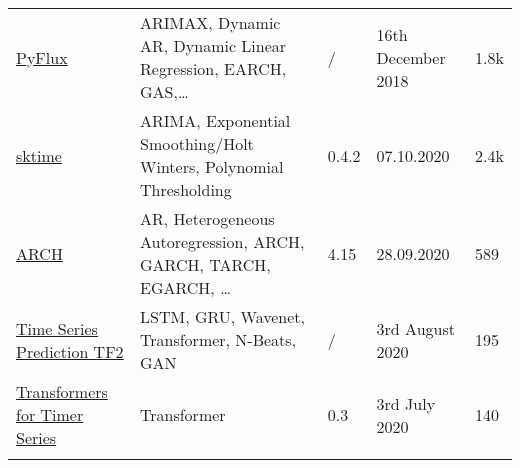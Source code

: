 \begin{table}[h]
{\begin{tabular}{lllll}
            \href{https://github.com/RJT1990/pyflux}{PyFlux}                                            & ARIMAX, Dynamic AR, Dynamic Linear Regression, EARCH, GAS,\ldots                                                                                                                                                                                                                                                                  & /         & 16th December 2018    & 1.8k  \\\addlinespace
            \href{https://github.com/alan-turing-institute/sktime}{sktime}                              & ARIMA, Exponential Smoothing/Holt Winters, Polynomial Thresholding                                                                                                                                                                                                                                                                & 0.4.2     & 07.10.2020            & 2.4k  \\\addlinespace
            \href{https://github.com/bashtage/arch}{ARCH}                                               & AR, Heterogeneous Autoregression, ARCH, GARCH, TARCH, EGARCH, \ldots                                                                                                                                                                                                                                                              & 4.15      & 28.09.2020            & 589   \\\addlinespace
            \href{https://github.com/LongxingTan/Time-series-prediction}{Time Series Prediction TF2}    & LSTM, GRU, Wavenet, Transformer, N-Beats, GAN                                                                                                                                                                                                                                                                                     & /         & 3rd August 2020       & 195   \\\addlinespace
            \href{https://github.com/maxjcohen/transformer}{Transformers for Timer Series}              & Transformer                                                                                                                                                                                                                                                                                                                       & 0.3       & 3rd July 2020         & 140   \\\addlinespace

\end{tabular}}
\end{table}
